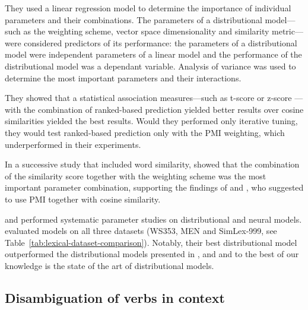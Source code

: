 They used a linear regression model to determine the importance of individual parameters and their combinations. The parameters of a distributional model---such as the weighting scheme, vector space dimensionality and similarity metric---were considered predictors of its performance: the parameters of a distributional model were independent parameters of a linear model and the performance of the distributional model was a dependant variable. Analysis of variance was used to determine the most important parameters and their interactions.

They showed that a statistical association measures---such as t-score or z-score \cite{Evert05}---with the combination of ranked-based prediction yielded better results over cosine similarities yielded the best results. Would they performed only iterative tuning, they would test ranked-based prediction only with the PMI weighting, which underperformed in their experiments.

In a successive study that included word similarity, \citet{lapesa2014large} showed that the combination of the similarity score together with the weighting scheme was the most important parameter combination, supporting the findings of  and , who suggested to use PMI together with cosine similarity.


 and  performed systematic parameter studies on distributional and neural models.  evaluated models on all three datasets (WS353, MEN and SimLex-999, see Table~\ref{tab:lexical-dataset-comparison}). Notably, their best distributional model outperformed the distributional models presented in \citet{hill2014simlex}, \citet{kiela-clark:2014:CVSC} and \citet{baroni-dinu-kruszewski:2014:P14-1} and to the best of our knowledge is the state of the art of distributional models.

\subsection{Disambiguation of verbs in context}
\label{sec:disamb}

